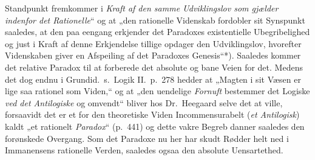 Standpunkt fremkommer i \emph{Kraft af den samme Udviklingslov som gjælder
indenfor det Rationelle}“ og at „den rationelle Videnskab fordobler sit
Synspunkt saaledes, at den paa eengang erkjender det Paradoxes existentielle
Ubegribelighed og just i Kraft af denne Erkjendelse tillige opdager den
Udviklingslov, hvorefter Videnskaben giver en Afspeiling af det Paradoxes
Genesis“*).
Saaledes kommer det relative Paradox til at forberede det absolute og bane
Veien for det. Medens det dog endnu i Grundid.\ s.\ Logik II.\ p.\ 278 hedder
at „Magten i sit Væsen er lige saa rationel som Viden,“ og at „den uendelige
\emph{Fornuft} bestemmer det Logiske \emph{ved det Antilogiske} og omvendt“
bliver hos Dr.\ Heegaard selve det at ville, forsaavidt det er et for den
theoretiske Viden Incommensurabelt (\emph{et Antilogisk}) kaldt „et rationelt
\emph{Paradox}“ (p.\ 441) og dette vakre Begreb
danner saaledes den forønskede Overgang. Som det Paradoxe nu her har
skudt Rødder helt ned i Immanensens rationelle Verden, saaledes ogsaa den
absolute Uensartethed.


